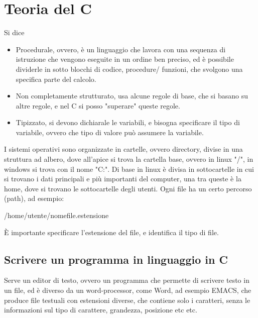 \documentclass[a4paper,12pt]{article}
\begin{document}
\begin{comment}
	\subsubsection{Notazione in eccesso}
	
	\section{Funzionamento della macchina di Turing}
	La macchina di Turing venne ipotizzata attorno al 1930 ed è una astrazione matematica di un processo che permette di risolvere attraverso gli algoritmi 
	
	\newpage
	\end{comment}
	
	\section{Teoria del C}
	Si dice
	\begin{itemize}
		\item Procedurale, ovvero, è un linguaggio che lavora con una sequenza di istruzione che vengono eseguite in un ordine ben preciso, ed è possibile dividerle in sotto blocchi di codice, procedure/ funzioni, che svolgono una specifica parte del calcolo.
		\item Non completamente strutturato, usa alcune regole di base, che si basano su altre regole, e nel C si posso "superare" queste regole.
		\item Tipizzato, si devono dichiarale le variabili, e bisogna specificare il tipo di variabile, ovvero che tipo di valore può assumere la variabile.
	\end{itemize}
	I sistemi operativi sono organizzate in cartelle, ovvero directory, divise in una struttura ad albero, dove all'apice si trova la cartella base, ovvero in linux "/", in windows si trova con il nome "C:".
	Di base in linux è divisa in sottocartelle in cui si trovano i dati principali e più importanti del computer, una tra queste è la home, dove si trovano le sottocartelle degli utenti.
	Ogni file ha un certo percorso (path), ad esempio:
	
	\begin{center}
		/home/utente/nomefile.estensione
	\end{center}
	È importante specificare l'estensione del file, e identifica il tipo di file. \newline
	
	\subsection{Scrivere un programma in linguaggio in C}
	Serve un editor di testo, ovvero un programma che permette di scrivere testo in un file, ed è diverso da un word-processor, come Word, ad esempio EMACS, che produce file testuali con estensioni diverse, che contiene solo i caratteri, senza le informazioni sul tipo di carattere, grandezza, posizione etc etc.
	
\end{document}
